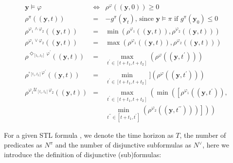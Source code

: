 \documentclass[a4paper]{report}
\begin{document}
\begin{equation}
    \label{robustness definition}
    \begin{array}{lll}
    \boldsymbol{y} \vDash \varphi & \Leftrightarrow & \rho^{\varphi}((\boldsymbol{y}, 0)) \geq 0 \\

    \rho^{\pi}((\boldsymbol{y}, t)) & = & -g^{\pi}\left(\boldsymbol{y}_{t}\right) \text {, since } \boldsymbol{y} \vDash \pi \text { if } g^{\pi}\left(\boldsymbol{y}_{0}\right) \leq 0 \\

    \rho^{\varphi_{1} \wedge \varphi_{2}}((\boldsymbol{y}, t)) & = & \min \left(\rho^{\varphi_{1}}((\boldsymbol{y}, t)), \rho^{\varphi_{2}}((\boldsymbol{y}, t))\right) \\

    \rho^{\varphi_{1} \vee \varphi_{2}}((\boldsymbol{y}, t)) & = & \max \left(\rho^{\varphi_{1}}((\boldsymbol{y}, t)), \rho^{\varphi_{2}}((\boldsymbol{y}, t))\right) \\

    \rho^{\Diamond_{\left[t_{1}, t_{2}\right]} \varphi^{\prime}}((\boldsymbol{y}, t)) & = & \max _{t^{\prime} \in\left[t+t_{1}, t+t_{2}\right]}\left(\rho^{\varphi}\left(\left(\boldsymbol{y}, t^{\prime}\right)\right)\right)\\

    \rho^{\square_{\left[t_{1}, t_{2}\right]} \varphi^{\prime}}((\boldsymbol{y}, t)) & = & \min _{t^{\prime} \in\left[t+t_{1}, t+t_{2}\right]}] \left(\rho^{\varphi} \left( \left( \boldsymbol{y}, t^{\prime} \right) \right) \right)\\

    \rho^{\varphi_{1} \mathcal{U}_{\left[t_{1}, t_{2}\right]} \varphi_{2}}((\boldsymbol{y}, t)) & = & \max _{t^{\prime} \in\left[t+t_{1}, t+t_{2}\right]}\left(\operatorname {min} \left(\left[\rho^{\varphi_{1}}\left(\left(\boldsymbol{y}, t^{\prime}\right)\right), \right.\right.\right. \\ 
    & &
     \min _{ t^{\prime \prime} \in [t+t_{1}, t^{\prime}]} 
     \left.\left.\left.\left(\rho^{\varphi_{2}}\left( \left( \boldsymbol{y}, t^{\prime \prime}\right)\right)\right) \right] \right) \right)

    \end{array}
    \end{equation}

For a given STL formula , we denote the time horizon as $T$, the number of predicates as $N^\pi$ and the number of disjunctive subformulas as $N^\vee$, here we introduce the definition of disjunctive (sub)formulas:
\end{document}
